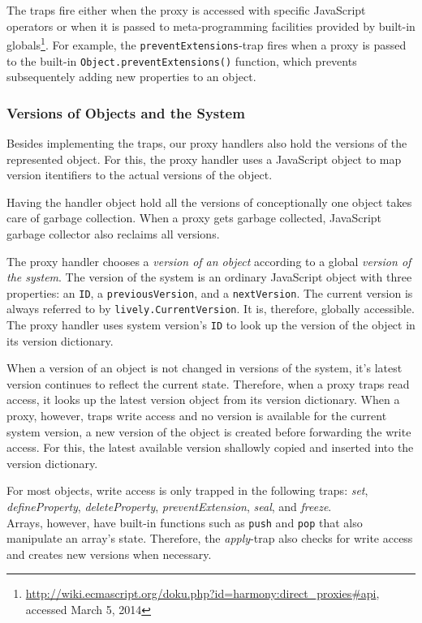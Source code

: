 The traps fire either when the proxy is accessed with specific JavaScript operators or when it is passed to meta-programming facilities provided by built-in globals\footnote{\url{http://wiki.ecmascript.org/doku.php?id=harmony:direct_proxies\#api}, accessed March 5, 2014}.
For example, the \lstinline{preventExtensions}-trap fires when a proxy is passed to the built-in \lstinline{Object.preventExtensions()} function, which prevents subsequentely adding new properties to an object.


\subsubsection{Versions of Objects and the System} \label{subsubsec:DocumentModelProblem}

Besides implementing the traps, our proxy handlers also hold the versions of the represented object.
For this, the proxy handler uses a JavaScript object to map version itentifiers to the actual versions of the object.

Having the handler object hold all the versions of conceptionally one object takes care of garbage collection.
When a proxy gets garbage collected, JavaScript garbage collector also reclaims all versions.

The proxy handler chooses a \emph{version of an object} according to a global \emph{version of the system}.
The version of the system is an ordinary JavaScript object with three properties: an \lstinline{ID}, a \lstinline{previousVersion}, and a \lstinline{nextVersion}.
The current version is always referred to by \lstinline{lively.CurrentVersion}.
It is, therefore, globally accessible.
The proxy handler uses system version's \lstinline{ID} to look up the version of the object in its version dictionary.

When a version of an object is not changed in versions of the system, it's latest version continues to reflect the current state.
Therefore, when a proxy traps read access, it looks up the latest version object from its version dictionary.
When a proxy, however, traps write access and no version is available for the current system version, a new version of the object is created before forwarding the write access.
For this, the latest available version shallowly copied and inserted into the version dictionary.

For most objects, write access is only trapped in the following traps: \emph{set}, \emph{defineProperty}, \emph{deleteProperty}, \emph{preventExtension}, \emph{seal}, and \emph{freeze}.\\
Arrays, however, have built-in functions such as \lstinline{push} and \lstinline{pop} that also manipulate an array's state.
Therefore, the \emph{apply}-trap also checks for write access and creates new versions when necessary.

